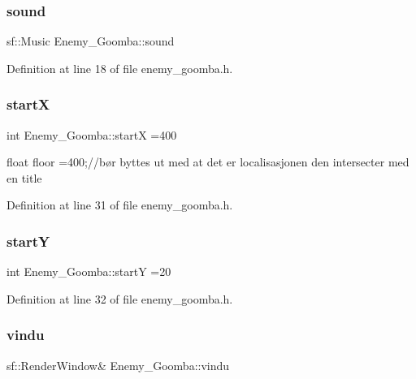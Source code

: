 \hypertarget{class_enemy___goomba_ae247248654854e3be4e5cecc6bea1b08}{}\label{class_enemy___goomba_ae247248654854e3be4e5cecc6bea1b08} 
\subsubsection{\texorpdfstring{sound}{sound}}
{\footnotesize\ttfamily sf\+::\+Music Enemy\+\_\+\+Goomba\+::sound}



Definition at line 18 of file enemy\+\_\+goomba.\+h.

\hypertarget{class_enemy___goomba_a4f762d1bb68be95f6ed06a25d5f61721}{}\label{class_enemy___goomba_a4f762d1bb68be95f6ed06a25d5f61721} 
\subsubsection{\texorpdfstring{startX}{startX}}
{\footnotesize\ttfamily int Enemy\+\_\+\+Goomba\+::startX =400}



float floor =400;//bør byttes ut med at det er localisasjonen den intersecter med en title 



Definition at line 31 of file enemy\+\_\+goomba.\+h.

\hypertarget{class_enemy___goomba_a8d459a604218f1a007e8e62ba95dd70a}{}\label{class_enemy___goomba_a8d459a604218f1a007e8e62ba95dd70a} 
\subsubsection{\texorpdfstring{startY}{startY}}
{\footnotesize\ttfamily int Enemy\+\_\+\+Goomba\+::startY =20}



Definition at line 32 of file enemy\+\_\+goomba.\+h.

\hypertarget{class_enemy___goomba_ab4eed505739ee97ea1c682c04b642537}{}\label{class_enemy___goomba_ab4eed505739ee97ea1c682c04b642537} 
\subsubsection{\texorpdfstring{vindu}{vindu}}
{\footnotesize\ttfamily sf\+::\+Render\+Window\& Enemy\+\_\+\+Goomba\+::vindu}



